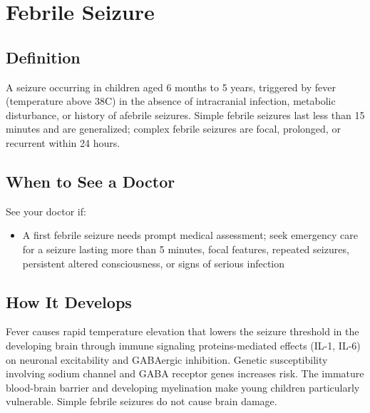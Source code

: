 \chapter{Febrile Seizure}

\section*{Definition}
A seizure occurring in children aged 6 months to 5 years, triggered by fever (temperature above 38\textdegree{}C) in the absence of intracranial infection, metabolic disturbance, or history of afebrile seizures. Simple febrile seizures last less than 15 minutes and are generalized; complex febrile seizures are focal, prolonged, or recurrent within 24 hours.

\section*{When to See a Doctor}
See your doctor if:
\begin{itemize}
  \item A first febrile seizure needs prompt medical assessment; seek emergency care for a seizure lasting more than 5 minutes, focal features, repeated seizures, persistent altered consciousness, or signs of serious infection
\end{itemize}

\section*{How It Develops}
Fever causes rapid temperature elevation that lowers the seizure threshold in the developing brain through immune signaling proteins-mediated effects (IL-1, IL-6) on neuronal excitability and GABAergic inhibition. Genetic susceptibility involving sodium channel and GABA receptor genes increases risk. The immature blood-brain barrier and developing myelination make young children particularly vulnerable. Simple febrile seizures do not cause brain damage.

